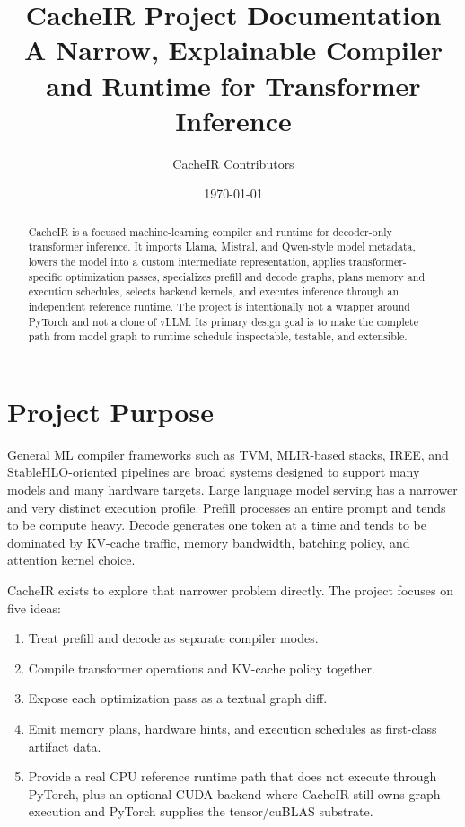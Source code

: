 \documentclass[11pt]{article}
\title{\textbf{CacheIR Project Documentation}\\
\large A Narrow, Explainable Compiler and Runtime for Transformer Inference}
\author{CacheIR Contributors}
\date{\today}
\begin{document}
\maketitle

\begin{abstract}
CacheIR is a focused machine-learning compiler and runtime for decoder-only
transformer inference. It imports Llama, Mistral, and Qwen-style model metadata,
lowers the model into a custom intermediate representation, applies
transformer-specific optimization passes, specializes prefill and decode graphs,
plans memory and execution schedules, selects backend kernels, and executes
inference through an independent reference runtime. The project is intentionally
not a wrapper around PyTorch and not a clone of vLLM. Its primary design goal is
to make the complete path from model graph to runtime schedule inspectable,
testable, and extensible.
\end{abstract}

\tableofcontents
\newpage

\section{Project Purpose}

General ML compiler frameworks such as TVM, MLIR-based stacks, IREE, and
StableHLO-oriented pipelines are broad systems designed to support many models
and many hardware targets. Large language model serving has a narrower and very
distinct execution profile. Prefill processes an entire prompt and tends to be
compute heavy. Decode generates one token at a time and tends to be dominated by
KV-cache traffic, memory bandwidth, batching policy, and attention kernel choice.

CacheIR exists to explore that narrower problem directly. The project focuses on
five ideas:

\begin{enumerate}[leftmargin=*]
  \item Treat prefill and decode as separate compiler modes.
  \item Compile transformer operations and KV-cache policy together.
  \item Expose each optimization pass as a textual graph diff.
  \item Emit memory plans, hardware hints, and execution schedules as first-class
        artifact data.
  \item Provide a real CPU reference runtime path that does not execute through
        PyTorch, plus an optional CUDA backend where CacheIR still owns graph
        execution and PyTorch supplies the tensor/cuBLAS substrate.
\end{enumerate}
\end{document}
